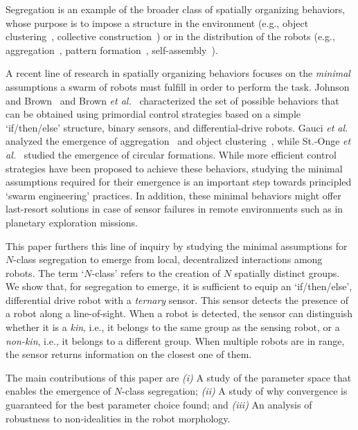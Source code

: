 \documentclass[letterpaper, 10 pt, conference]{ieeeconf}
\begin{document}
Segregation is an example of the broader class of spatially organizing
behaviors, whose purpose is to impose a structure in the environment (e.g.,
object clustering~\cite{gauci_clustering_2014}, collective
construction~\cite{Bolger2010}) or in the distribution of the robots (e.g.,
aggregation~\cite{shlyakhov_survey_2017}, pattern
formation~\cite{Pinciroli:DARS2016}, self-assembly~\cite{gross2008self}).

A recent line of research in spatially organizing behaviors focuses on the
\emph{minimal} assumptions a swarm of robots must fulfill in order to perform
the task. Johnson and Brown~\cite{johnson_evolving_2016} and Brown \emph{et
  al.}~\cite{brown_discovery_2018} characterized the set of possible behaviors
that can be obtained using primordial control strategies based on a simple
`if/then/else' structure, binary sensors, and differential-drive robots. Gauci
\emph{et al.} analyzed the emergence of aggregation~\cite{gauci_evolving_2014}
and object clustering~\cite{gauci_clustering_2014}, while St.-Onge \emph{et
  al.}~\cite{StOnge:IROS2018} studied the emergence of circular
formations. While more efficient control strategies have been proposed to
achieve these behaviors, studying the minimal assumptions required for their
emergence is an important step towards principled `swarm engineering'
practices. In addition, these minimal behaviors might offer last-resort
solutions in case of sensor failures in remote environments such as in planetary
exploration missions.

This paper furthers this line of inquiry by studying the minimal assumptions for
$N$-class segregation to emerge from local, decentralized interactions among
robots. The term `$N$-class' refers to the creation of $N$ spatially distinct
groups. We show that, for segregation to emerge, it is sufficient to equip an
`if/then/else', differential drive robot with a \emph{ternary} sensor. This
sensor detects the presence of a robot along a line-of-sight. When a robot is detected, the
sensor can distinguish whether it is a \emph{kin}, i.e., it belongs to the same
group as the sensing robot, or a \emph{non-kin}, i.e., it belongs to a different
group. When multiple robots are in range, the sensor returns information on the
closest one of them.

The main contributions of this paper are \emph{(i)} A study of the parameter
space that enables the emergence of $N$-class segregation; \emph{(ii)} A study
of why convergence is guaranteed for the best parameter choice found; and
\emph{(iii)} An analysis of robustness to non-idealities in the robot
morphology.
\end{document}
